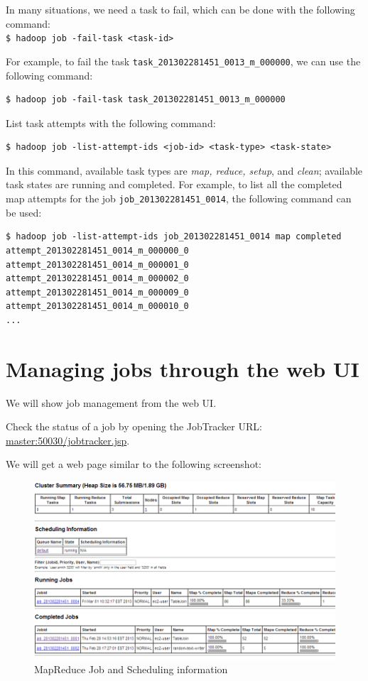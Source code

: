 In many situations, we need a task to fail, which can be done with the following command: \\
\verb|$ hadoop job -fail-task <task-id> |

For example, to fail the task \verb|task_201302281451_0013_m_000000|, we can use the following command:
\lstset{style=bashstyle}
\begin{lstlisting}
$ hadoop job -fail-task task_201302281451_0013_m_000000
\end{lstlisting}

List task attempts with the following command:
\lstset{style=bashstyle}
\begin{lstlisting}
$ hadoop job -list-attempt-ids <job-id> <task-type> <task-state>
\end{lstlisting}

In this command, available task types are \emph{map, reduce, setup}, and \emph{clean}; available task states are running and completed.
For example, to list all the completed map attempts for the job \verb|job_201302281451_0014|, the following command can be used: 
\lstset{style=bashstyle}
\begin{lstlisting}
$ hadoop job -list-attempt-ids job_201302281451_0014 map completed
attempt_201302281451_0014_m_000000_0
attempt_201302281451_0014_m_000001_0
attempt_201302281451_0014_m_000002_0
attempt_201302281451_0014_m_000009_0
attempt_201302281451_0014_m_000010_0
...
\end{lstlisting}

\section{Managing jobs through the web UI}
We will show job management from the web UI.

Check the status of a job by opening the JobTracker URL: \url{master:50030/jobtracker.jsp}.

We will get a web page similar to the following screenshot:
\begin{figure}[h]
  \centering
  \includegraphics[width=\textwidth]{figs/5163os_04_11.png}
  \caption{MapReduce Job and Scheduling information}\label{fig:mapred.status}
\end{figure} 

